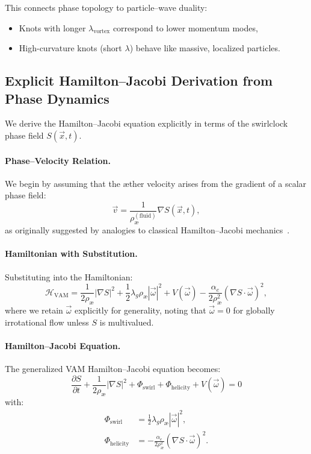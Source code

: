 This connects phase topology to particle–wave duality:
\begin{itemize}
\item Knots with longer \( \lambda_\text{vortex} \) correspond to lower momentum modes,
\item High-curvature knots (short \( \lambda \)) behave like massive, localized particles.
\end{itemize}

\subsection*{Explicit Hamilton--Jacobi Derivation from Phase Dynamics}

We derive the Hamilton--Jacobi equation explicitly in terms of the swirlclock phase field \( S(\vec{x}, t) \).

\paragraph{Phase--Velocity Relation.}
We begin by assuming that the \ae ther velocity arises from the gradient of a scalar phase field:
\begin{equation}
\vec{v} = \frac{1}{\rho_\text{\ae}^{(\text{fluid})}} \nabla S(\vec{x}, t),
\end{equation}
as originally suggested by analogies to classical Hamilton--Jacobi mechanics~\cite{arnold1998topological,moffatt1969degree}.

\paragraph{Hamiltonian with Substitution.}
Substituting into the Hamiltonian:
\begin{equation}
\mathcal{H}_\text{VAM} = \frac{1}{2 \rho_\text{\ae}} |\nabla S|^2 + \frac{1}{2} \lambda_g \rho_\text{\ae} |\vec{\omega}|^2 + V(\vec{\omega}) - \frac{\alpha_e}{2 \rho_\text{\ae}^2} (\nabla S \cdot \vec{\omega})^2,
\end{equation}
where we retain \( \vec{\omega} \) explicitly for generality, noting that \( \vec{\omega} = 0 \) for globally irrotational flow unless \( S \) is multivalued.

\paragraph{Hamilton--Jacobi Equation.}
The generalized VAM Hamilton--Jacobi equation becomes:
\begin{equation}
\boxed{
\frac{\partial S}{\partial t} + \frac{1}{2 \rho_\text{\ae}} |\nabla S|^2 + \Phi_\text{swirl} + \Phi_\text{helicity} + V(\vec{\omega}) = 0
}
\end{equation}
with:
\begin{align*}
\Phi_\text{swirl} &= \frac{1}{2} \lambda_g \rho_\text{\ae} |\vec{\omega}|^2, \\
\Phi_\text{helicity} &= -\frac{\alpha_e}{2 \rho_\text{\ae}^2} (\nabla S \cdot \vec{\omega})^2.
\end{align*}

